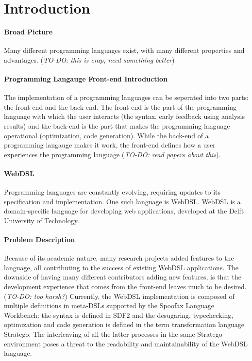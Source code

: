 
\chapter{\label{chap:introduction}Introduction}

  \subsubsection{Broad Picture}
  Many different programming languages exist, with many different properties and advantages. (\emph{TO-DO: this is crap, need something better})

  \subsubsection{Programming Langauge Front-end Introduction}
  The implementation of a programming languages can be seperated into two parts: the front-end and the back-end. The front-end is the part of the programming language with which the user interacts (the syntax, early feedback using analysis results) and the back-end is the part that makes the programming language operational (optimization, code generation). While the back-end of a programming langauge makes it work, the front-end defines how a user experiences the programming language (\emph{TO-DO: read papers about this}).

  \subsubsection{WebDSL}
  Programming languages are constantly evolving, requiring updates to its specification and implementation. One such language is WebDSL. WebDSL is a domain-specific language for developing web applications, developed at the Delft University of Technology.

  \subsubsection{Problem Description}
  Because of its academic nature, many research projects added features to the language, all contributing to the success of existing WebDSL applications. The downside of having many different contributors adding new features, is that the development experience that comes from the front-end leaves much to be desired. (\emph{TO-DO: too harsh?}) Currently, the WebDSL implementation is composed of multiple definitions in meta-DSLs supported by the Spoofax Language Workbench: the syntax is defined in SDF2 and the desugaring, typechecking, optimization and code generation is defined in the term transformation language Stratego. The interleaving of all the latter processes in the same Stratego environment poses a threat to the readability and maintainability of the WebDSL language.

